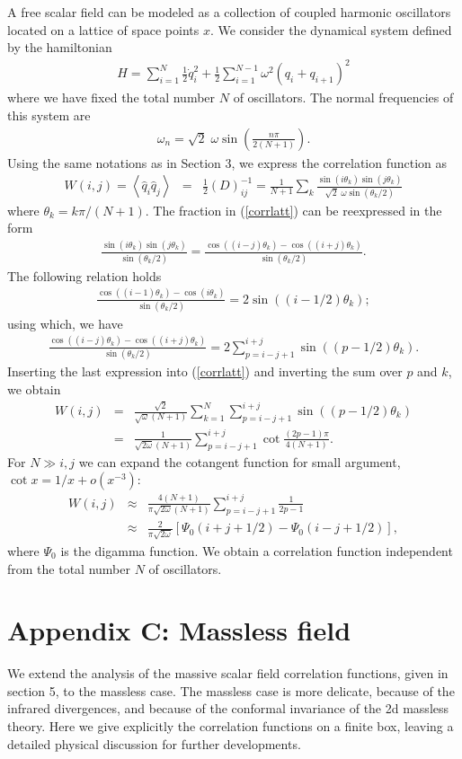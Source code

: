 \documentclass[11pt, nofootinbib]{revtex4-2}
\newcommand{\bea}{\begin{eqnarray}}
\newcommand{\eea}{\end{eqnarray}}
\begin{document}
A free scalar field can be modeled as a collection of coupled harmonic
oscillators located on a lattice of space points $x$.  We consider the
dynamical system defined by the hamiltonian
%
\bea H= \sum_{i=1}^{N}\frac{1}{2}\dot{q}_i^2 +
\frac{1}{2}\sum_{i=1}^{N-1} \omega^2 \left( q_i+ q_{i+1} \right)^2
\eea
%
where we have fixed the total number $N$ of oscillators.  The normal
frequencies of this system are
%
\bea \omega_{n} = \sqrt{2} \; \omega \sin \left(\frac{n \pi}{2(N+1)}
\right).  \eea
%
Using the same notations as in Section 3, we express the
correlation function as
%
\bea 
W(i,j) = \left\langle \hat{q}_i\hat{q}_j \right\rangle &=& \frac{1}{2}
\left(D\right)^{-1}_{ij} = {\frac{1}{N+1}} \sum_{k} \frac{\sin \left( i \theta_k \right)\sin
\left(j \theta_k \right)}{\sqrt{2} \; \omega \sin \left({\theta_k
}/{2} \right)}
\label{corrlatt}
\eea
%
where $\theta_k ={k \pi}/{(N+1)}$.  The fraction in (\ref{corrlatt})
can be reexpressed in the form
%
\bea \frac{\sin(i\theta_k) \sin(j \theta_k)}{\sin(\theta_k/2)}
=\frac{\cos((i-j)\theta_k) - \cos((i+j) \theta_k)}{\sin(\theta_k/2)}. 
\eea
%
The following relation holds
%
\bea \frac{\cos((i-1)\theta_k) - \cos(i \theta_k)}{\sin(\theta_k/2)} =
2 \sin((i-1/2)\theta_k); \eea
%
using which, we have
%
\bea \frac{\cos((i-j)\theta_k) - \cos((i+j)
\theta_k)}{\sin(\theta_k/2)} = 2 \sum^{i+j}_{p=i-j+1}
\sin((p-1/2)\theta_k).  \eea
%
Inserting the last expression into (\ref{corrlatt}) and inverting the
sum over $p$ and $k$, we obtain
%
\bea 
W(i,j) &=&
{\frac{\sqrt{2}}{\sqrt{\omega}(N+1)}} \sum_{k=1}^{N}
\sum^{i+j}_{p=i-j+1} \sin((p-1/2)\theta_k) \\
&=& {\frac{1}{\sqrt{2\omega}(N+1)}}\sum^{i+j}_{p=i-j+1} \cot
\frac{(2p-1) \pi}{4(N+1)}.  \eea
%
For $N \gg i,j$ we can expand the cotangent function for small
argument, $\cot x = 1/x +o(x^{-3})$:
%
\bea
W(i,j) &\approx& {\frac{4
(N+1)}{\pi \sqrt{2\omega}(N+1)}}\sum^{i+j}_{p=i-j+1} \frac{1}{2p-1} 
\nonumber\\
&\approx& \frac{2 }{\pi \sqrt{2\omega}} \left[ \Psi_0(i+j+1/2)
-\Psi_0(i-j+1/2)\right], \eea
%
where $\Psi_0$ is the digamma function.  We obtain a correlation
function independent from the total number $N$ of oscillators. 

\section*{Appendix C: Massless field}

We extend the analysis of the massive scalar field correlation
functions, given in section 5, to the massless case.  The massless
case is more delicate, because of the infrared divergences, and
because of the conformal invariance of the 2d massless theory.  Here
we give explicitly the correlation functions on a finite box, leaving
a detailed physical discussion for further developments.
\end{document}
